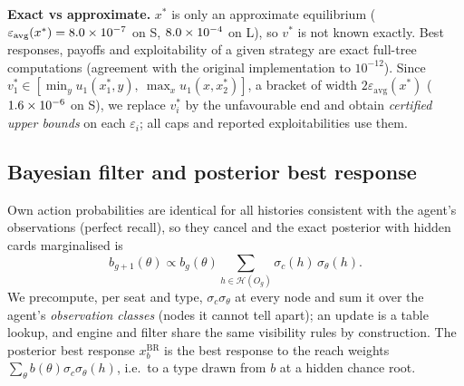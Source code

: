 \documentclass[11pt]{article}
\newcommand{\eps}{\varepsilon}
\newcommand{\BR}{\mathrm{BR}}
\begin{document}
\textbf{Exact vs approximate.} $x^*$ is only an approximate equilibrium ($\eps_{\mathrm{avg}}(x^*)=\RepsS$ on S, $8.0\times10^{-4}$ on L), so $v^*$ is not known exactly. Best responses, payoffs and exploitability of a given strategy are exact full-tree computations (agreement with the original implementation to $10^{-12}$). Since $v_1^*\in[\min_y u_1(x_1^*,y),\ \max_x u_1(x,x_2^*)]$, a bracket of width $2\eps_{\mathrm{avg}}(x^*)$ ($1.6\times10^{-6}$ on S), we replace $v_i^*$ by the unfavourable end and obtain \emph{certified upper bounds} on each $\eps_i$; all caps and reported exploitabilities use them.

\subsection{Bayesian filter and posterior best response}
Own action probabilities are identical for all histories consistent with the agent's observations (perfect recall), so they cancel and the exact posterior with hidden cards marginalised is
\begin{equation}
b_{g+1}(\theta)\propto b_g(\theta)\sum_{h\in\mathcal H(O_g)}\sigma_c(h)\,\sigma_\theta(h).
\end{equation}
We precompute, per seat and type, $\sigma_c\sigma_\theta$ at every node and sum it over the agent's \emph{observation classes} (nodes it cannot tell apart); an update is a table lookup, and engine and filter share the same visibility rules by construction. The posterior best response $x^{\BR}_b$ is the best response to the reach weights $\sum_\theta b(\theta)\sigma_c\sigma_\theta(h)$, i.e.\ to a type drawn from $b$ at a hidden chance root.
\end{document}
